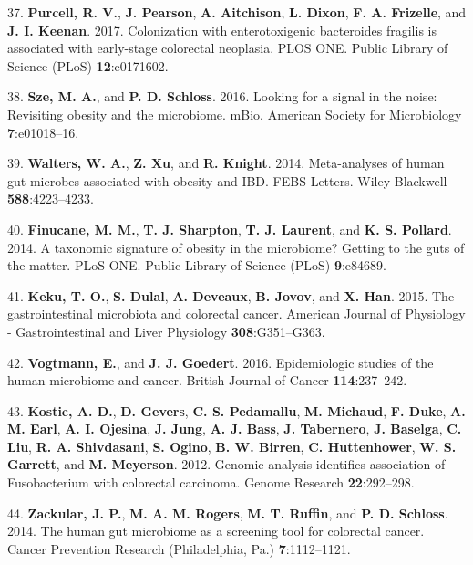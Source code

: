 \documentclass[12pt,]{article}
\begin{document}
\hypertarget{ref-Purcell2017}{}
37. \textbf{Purcell, R. V.}, \textbf{J. Pearson}, \textbf{A. Aitchison},
\textbf{L. Dixon}, \textbf{F. A. Frizelle}, and \textbf{J. I. Keenan}.
2017. Colonization with enterotoxigenic bacteroides fragilis is
associated with early-stage colorectal neoplasia. PLOS ONE. Public
Library of Science (PLoS) \textbf{12}:e0171602.

\hypertarget{ref-Sze2016}{}
38. \textbf{Sze, M. A.}, and \textbf{P. D. Schloss}. 2016. Looking for a
signal in the noise: Revisiting obesity and the microbiome. mBio.
American Society for Microbiology \textbf{7}:e01018--16.

\hypertarget{ref-Walters2014}{}
39. \textbf{Walters, W. A.}, \textbf{Z. Xu}, and \textbf{R. Knight}.
2014. Meta-analyses of human gut microbes associated with obesity and
IBD. FEBS Letters. Wiley-Blackwell \textbf{588}:4223--4233.

\hypertarget{ref-Finucane2014}{}
40. \textbf{Finucane, M. M.}, \textbf{T. J. Sharpton}, \textbf{T. J.
Laurent}, and \textbf{K. S. Pollard}. 2014. A taxonomic signature of
obesity in the microbiome? Getting to the guts of the matter. PLoS ONE.
Public Library of Science (PLoS) \textbf{9}:e84689.

\hypertarget{ref-keku_gastrointestinal_2015}{}
41. \textbf{Keku, T. O.}, \textbf{S. Dulal}, \textbf{A. Deveaux},
\textbf{B. Jovov}, and \textbf{X. Han}. 2015. The gastrointestinal
microbiota and colorectal cancer. American Journal of Physiology -
Gastrointestinal and Liver Physiology \textbf{308}:G351--G363.

\hypertarget{ref-vogtmann_epidemiologic_2016}{}
42. \textbf{Vogtmann, E.}, and \textbf{J. J. Goedert}. 2016.
Epidemiologic studies of the human microbiome and cancer. British
Journal of Cancer \textbf{114}:237--242.

\hypertarget{ref-kostic_genomic_2012}{}
43. \textbf{Kostic, A. D.}, \textbf{D. Gevers}, \textbf{C. S.
Pedamallu}, \textbf{M. Michaud}, \textbf{F. Duke}, \textbf{A. M. Earl},
\textbf{A. I. Ojesina}, \textbf{J. Jung}, \textbf{A. J. Bass},
\textbf{J. Tabernero}, \textbf{J. Baselga}, \textbf{C. Liu}, \textbf{R.
A. Shivdasani}, \textbf{S. Ogino}, \textbf{B. W. Birren}, \textbf{C.
Huttenhower}, \textbf{W. S. Garrett}, and \textbf{M. Meyerson}. 2012.
Genomic analysis identifies association of Fusobacterium with colorectal
carcinoma. Genome Research \textbf{22}:292--298.

\hypertarget{ref-zackular_human_2014}{}
44. \textbf{Zackular, J. P.}, \textbf{M. A. M. Rogers}, \textbf{M. T.
Ruffin}, and \textbf{P. D. Schloss}. 2014. The human gut microbiome as a
screening tool for colorectal cancer. Cancer Prevention Research
(Philadelphia, Pa.) \textbf{7}:1112--1121.
\end{document}
